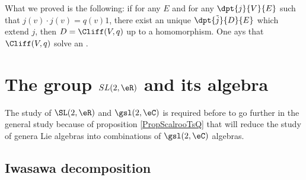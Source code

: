 What we proved is the following: if for any $E$ and for any $\dpt{j}{V}{E}$ such that $j(v)\cdot j(v)=q(v)1$, there exist an unique $\dpt{\tilde{j}}{D}{E}$ which extend $j$, then $D=\Cliff(V,q)$ up to a homomorphism. One ays that $\Cliff(V,q)$ solve an .


\section{The group \texorpdfstring{$SL(2,\eR)$}{SL2R} and its algebra}  \label{SecToolSL}

The study of \( \SL(2,\eR)\) and \( \gsl(2,\eC)\) is required before to go further in the general study because of proposition \ref{PropScalrooTsQ} that will reduce the study of genera Lie algebras into combinations of \( \gsl(2,\eC)\) algebras.

\subsection{Iwasawa decomposition}

